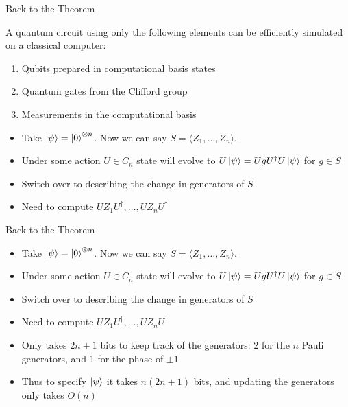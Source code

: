 \documentclass[11pt,aspectratio=1610]{beamer}
\begin{document}
\begin{frame}{Back to the Theorem}
	\begin{theorem}
		A quantum circuit using only the following elements can be efficiently simulated on a classical computer:
		\begin{enumerate}
			\item Qubits prepared in computational basis states
			\item Quantum gates from the Clifford group
			\item Measurements in the computational basis
		\end{enumerate}
	\end{theorem}
	\begin{itemize}
		\item Take $\ket{\psi} = \ket{0}^{\otimes n}$. Now we can say $S = \langle Z_1, \ldots, Z_n\rangle$.
		\item Under some action $U\in C_n$ state will evolve to $U\ket{\psi} = UgU^\dagger U\ket{\psi}$ for $g\in S$
		\item Switch over to describing the change in generators of $S$
		\item Need to compute $UZ_1U^\dagger,\ldots, UZ_nU^\dagger$
	\end{itemize}

\end{frame}

\begin{frame}{Back to the Theorem}
	\begin{itemize}
		\item Take $\ket{\psi} = \ket{0}^{\otimes n}$. Now we can say $S = \langle Z_1, \ldots, Z_n\rangle$.
		\item Under some action $U\in C_n$ state will evolve to $U\ket{\psi} = UgU^\dagger U\ket{\psi}$ for $g\in S$
		\item Switch over to describing the change in generators of $S$
		\item Need to compute $UZ_1U^\dagger,\ldots, UZ_nU^\dagger$
		\item Only takes $2n+1$ bits to keep track of the generators: 2 for the $n$ Pauli generators, and 1 for the phase of $\pm 1$
		\item Thus to specify $\ket{\psi}$ it takes $n(2n+1)$ bits, and updating the generators only takes $O(n)$
	\end{itemize}
\end{frame}
\end{document}
